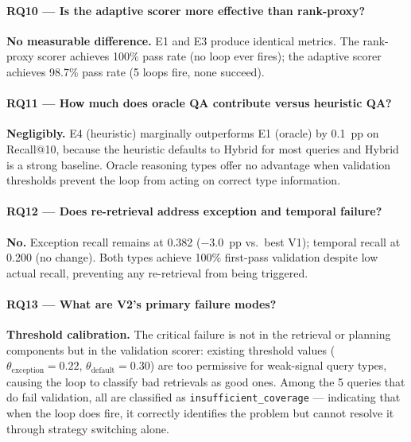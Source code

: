 \paragraph{RQ10 --- Is the adaptive scorer more effective than rank-proxy?} \textbf{No measurable difference.} E1 and E3 produce identical metrics. The rank-proxy scorer achieves 100\% pass rate (no loop ever fires); the adaptive scorer achieves 98.7\% pass rate (5 loops fire, none succeed).

\paragraph{RQ11 --- How much does oracle QA contribute versus heuristic QA?} \textbf{Negligibly.} E4 (heuristic) marginally outperforms E1 (oracle) by 0.1~pp on Recall@10, because the heuristic defaults to Hybrid for most queries and Hybrid is a strong baseline. Oracle reasoning types offer no advantage when validation thresholds prevent the loop from acting on correct type information.

\paragraph{RQ12 --- Does re-retrieval address exception and temporal failure?} \textbf{No.} Exception recall remains at 0.382 ($-$3.0~pp vs.\ best V1); temporal recall at 0.200 (no change). Both types achieve 100\% first-pass validation despite low actual recall, preventing any re-retrieval from being triggered.

\paragraph{RQ13 --- What are V2's primary failure modes?} \textbf{Threshold calibration.} The critical failure is not in the retrieval or planning components but in the validation scorer: existing threshold values ($\theta_{\text{exception}}{=}0.22$, $\theta_{\text{default}}{=}0.30$) are too permissive for weak-signal query types, causing the loop to classify bad retrievals as good ones. Among the 5 queries that do fail validation, all are classified as \texttt{insufficient\_coverage} --- indicating that when the loop does fire, it correctly identifies the problem but cannot resolve it through strategy switching alone.
